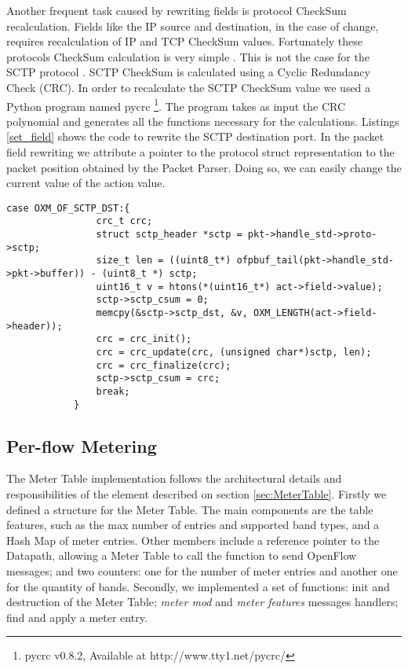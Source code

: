 Another frequent task caused by rewriting fields is protocol CheckSum recalculation. Fields like the IP source and destination, in the case of change, requires recalculation of IP and TCP CheckSum values. Fortunately these protocols CheckSum calculation is very simple \cite{rfc1071}. This is not the case for the SCTP protocol \cite{rfc3309}. SCTP CheckSum is calculated using a Cyclic Redundancy Check (CRC). In order to recalculate the SCTP CheckSum value we used a Python program named pycrc \footnote{pycrc v0.8.2, Available at http://www.tty1.net/pycrc/}. The program takes as input the CRC polynomial and generates all the functions necessary for the calculations. Listings \ref{set_field} shows the code to rewrite the SCTP destination port. In the packet field rewriting we attribute a pointer to the protocol struct representation to the packet position obtained by the Packet Parser. Doing so, we can easily change the current value of the action value.
\\
\begin{lstlisting}[caption={Ethernet parsing in the nbee_link module}, label=set_field,]
case OXM_OF_SCTP_DST:{
                crc_t crc;
                struct sctp_header *sctp = pkt->handle_std->proto->sctp;                
                size_t len = ((uint8_t*) ofpbuf_tail(pkt->handle_std->pkt->buffer)) - (uint8_t *) sctp;
                uint16_t v = htons(*(uint16_t*) act->field->value);
                sctp->sctp_csum = 0;
                memcpy(&sctp->sctp_dst, &v, OXM_LENGTH(act->field->header));
                crc = crc_init();
                crc = crc_update(crc, (unsigned char*)sctp, len);                            
                crc = crc_finalize(crc);
                sctp->sctp_csum = crc;
                break;        
            }
\end{lstlisting}  

\subsection{Per-flow Metering}

    The Meter Table implementation follows the architectural details and responsibilities of the element described on section \ref{sec:MeterTable}.
Firstly we defined a structure for the Meter Table. The main components are the table features, such as the max number of entries and supported band types, and a Hash Map of meter entries. Other members include a reference pointer to the Datapath, allowing a Meter Table to call the function to send OpenFlow messages; and two counters: one for the number of meter entries and another one for the quantity of bands. Secondly, we implemented a set of functions: init and destruction of the Meter Table; \textit{meter mod} and \textit{meter features} messages handlers; find and apply a meter entry.

